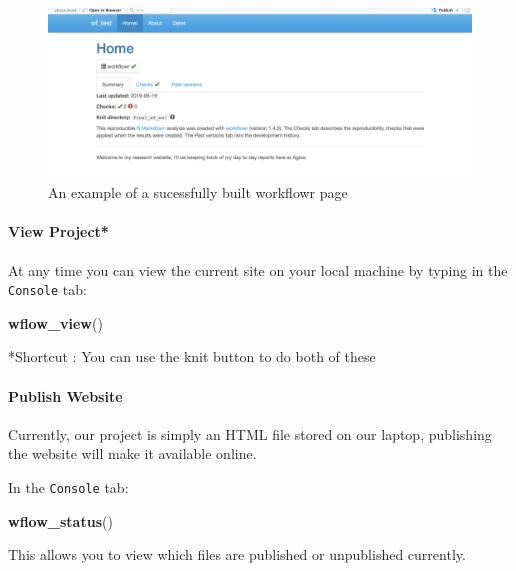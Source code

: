 \documentclass[openany]{article}
\newenvironment{Shaded}{\begin{snugshade}}{\end{snugshade}}
\newcommand{\KeywordTok}[1]{\textcolor[rgb]{0.13,0.29,0.53}{\textbf{#1}}}
\newcommand{\NormalTok}[1]{#1}
\let\oldparagraph\paragraph
\renewcommand{\paragraph}[1]{\oldparagraph{#1}\mbox{}}
\begin{document}
\begin{figure}

{\centering \includegraphics[width=0.9\linewidth]{images/Workflow_Photos/sample_wf} 

}

\caption{An example of a sucessfully built workflowr page}\label{fig:c4}
\end{figure}

\hypertarget{view-project}{%
\paragraph{View Project*}\label{view-project}}

At any time you can view the current site on your local machine by typing in the \texttt{Console} tab:

\begin{Shaded}
\begin{Highlighting}[]
\KeywordTok{wflow_view}\NormalTok{()}
\end{Highlighting}
\end{Shaded}

*Shortcut : You can use the knit button to do both of these

\hypertarget{publish-website}{%
\paragraph{Publish Website}\label{publish-website}}

Currently, our project is simply an HTML file stored on our laptop, publishing the website will make it available online.

In the \texttt{Console} tab:

\begin{Shaded}
\begin{Highlighting}[]
\KeywordTok{wflow_status}\NormalTok{()}
\end{Highlighting}
\end{Shaded}

This allows you to view which files are published or unpublished currently.
\end{document}
